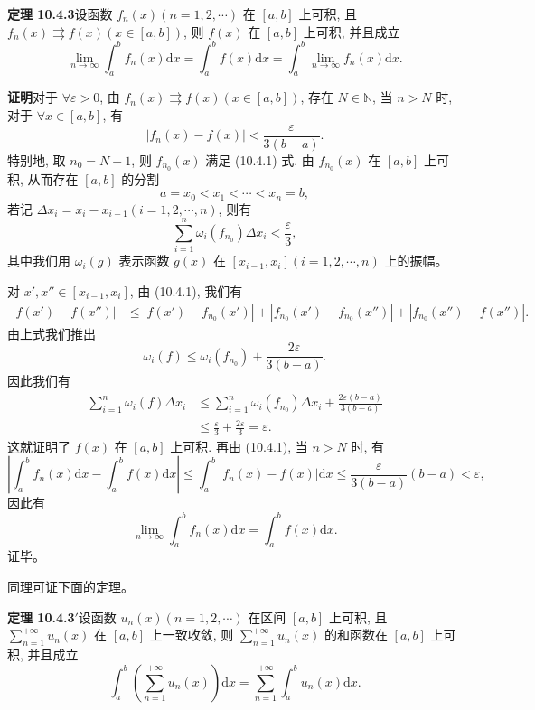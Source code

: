 \documentclass[UTF8, 12pt, fontset=fandol, oneside]{ctexart}
\begin{document}
\noindent\textbf{定理 10.4.3}\quad 设函数 $f_n(x)(n=1,2,\cdots)$ 在 $[a,b]$ 上可积, 且 $f_n(x)\rightrightarrows f(x)(x\in[a,b])$, 则 $f(x)$ 在 $[a,b]$ 上可积, 并且成立
\[
  \lim_{n\to\infty}\int_a^b f_n(x)\mathrm dx
  =\int_a^b f(x)\mathrm dx
  =\int_a^b\lim_{n\to\infty}f_n(x)\mathrm dx.
\]

\noindent\textbf{证明}\quad 对于 $\forall\varepsilon>0$, 由 $f_n(x)\rightrightarrows f(x)(x\in[a,b])$, 存在 $N\in\mathbb N$, 当 $n>N$ 时, 对于 $\forall x\in[a,b]$, 有
\begin{equation}
  |f_n(x)-f(x)|<\frac{\varepsilon}{3(b-a)}.
  \tag{10.4.1}
\end{equation}
特别地, 取 $n_0=N+1$, 则 $f_{n_0}(x)$ 满足 (10.4.1) 式. 由 $f_{n_0}(x)$ 在 $[a,b]$ 上可积, 从而存在 $[a,b]$ 的分割
\[
  a=x_0<x_1<\cdots<x_n=b,
\]
若记 $\Delta x_i=x_i-x_{i-1}(i=1,2,\cdots,n)$, 则有
\[
  \sum_{i=1}^n \omega_i(f_{n_0})\Delta x_i<\frac\varepsilon3,
\]
其中我们用 $\omega_i(g)$ 表示函数 $g(x)$ 在 $[x_{i-1},x_i](i=1,2,\cdots,n)$ 上的振幅。

对 $x',x''\in[x_{i-1},x_i]$, 由 (10.4.1), 我们有
\[
\begin{aligned}
  |f(x')-f(x'')|
  &\leq |f(x')-f_{n_0}(x')|+|f_{n_0}(x')-f_{n_0}(x'')|+|f_{n_0}(x'')-f(x'')|.
\end{aligned}
\]
由上式我们推出
\[
  \omega_i(f)\leq\omega_i(f_{n_0})+\frac{2\varepsilon}{3(b-a)}.
\]
因此我们有
\[
\begin{aligned}
  \sum_{i=1}^n \omega_i(f)\Delta x_i
  &\leq \sum_{i=1}^n \omega_i(f_{n_0})\Delta x_i+\frac{2\varepsilon(b-a)}{3(b-a)}\\
  &\leq \frac\varepsilon3+\frac{2\varepsilon}{3}=\varepsilon.
\end{aligned}
\]
这就证明了 $f(x)$ 在 $[a,b]$ 上可积. 再由 (10.4.1), 当 $n>N$ 时, 有
\[
  \left|\int_a^b f_n(x)\mathrm dx-\int_a^b f(x)\mathrm dx\right|
  \leq \int_a^b |f_n(x)-f(x)|\mathrm dx
  \leq \frac{\varepsilon}{3(b-a)}(b-a)<\varepsilon,
\]
因此有
\[
  \lim_{n\to\infty}\int_a^b f_n(x)\mathrm dx=\int_a^b f(x)\mathrm dx.
\]
证毕。

同理可证下面的定理。

\noindent\textbf{定理 10.4.3$'$}\quad 设函数 $u_n(x)(n=1,2,\cdots)$ 在区间 $[a,b]$ 上可积, 且 $\sum\limits_{n=1}^{+\infty}u_n(x)$ 在 $[a,b]$ 上一致收敛, 则 $\sum\limits_{n=1}^{+\infty}u_n(x)$ 的和函数在 $[a,b]$ 上可积, 并且成立
\begin{equation}
  \int_a^b\left(\sum_{n=1}^{+\infty}u_n(x)\right)\mathrm dx
  =\sum_{n=1}^{+\infty}\int_a^b u_n(x)\mathrm dx.
  \tag{10.4.2}
\end{equation}
\end{document}
